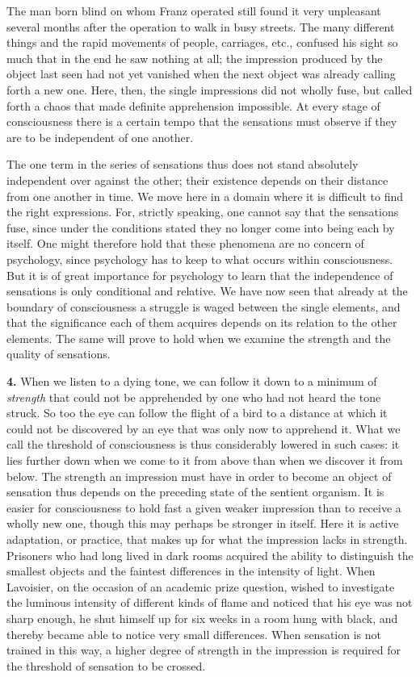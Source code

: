 \documentclass[12pt,a4paper]{book}
\newcommand{\opage}[1]{\marginnote{\footnotesize\textit{[#1]}}}
\begin{document}
The man born blind on whom Franz operated still found it very unpleasant
several months after the operation to walk in busy streets. The many
different things and the rapid movements of people, carriages, etc.,
confused his sight so much that in the end he saw nothing at all; the
impression produced by the object last seen had not yet vanished when
the next object was already calling forth a new one. Here, then, the
single impressions did not wholly fuse, but called forth a chaos that
made definite apprehension impossible. At every stage of consciousness
there is a certain tempo that the sensations must observe if they are to
be independent of one another.

The one term in the series of sensations thus does not stand absolutely
independent over against the other; their existence depends on their
distance from one another in time. We move here in a domain where it is
difficult to find the right expressions. For, strictly speaking, one
cannot say that the sensations fuse, since under the conditions stated
they no longer come into being each by itself. One might therefore hold
that these
\opage{130}phenomena are no concern of psychology, since psychology has
to keep to what occurs within consciousness. But it is of great
importance for psychology to learn that the independence of sensations
is only conditional and relative. We have now seen that already at the
boundary of consciousness a struggle is waged between the single
elements, and that the significance each of them acquires depends on its
relation to the other elements. The same will prove to hold when we
examine the strength and the quality of sensations.

\textbf{4.} When we listen to a dying tone, we can follow it down to a
minimum of \emph{strength} that could not be apprehended by one who had
not heard the tone struck. So too the eye can follow the flight of a
bird to a distance at which it could not be discovered by an eye that
was only now to apprehend it. What we call the threshold of
consciousness is thus considerably lowered in such cases: it lies
further down when we come to it from above than when we discover it from
below. The strength an impression must have in order to become an object
of sensation thus depends on the preceding state of the sentient
organism. It is easier for consciousness to hold fast a given weaker
impression than to receive a wholly new one, though this may perhaps be
stronger in itself. Here it is active adaptation, or practice, that
makes up for what the impression lacks in strength. Prisoners who had
long lived in dark rooms acquired the ability to distinguish the
smallest objects and the faintest differences in the intensity of light.
When Lavoisier, on the occasion of an academic prize question, wished to
investigate the luminous intensity of different kinds of flame and
noticed that his eye was not sharp enough, he shut himself up for six
weeks in a room hung with black, and thereby became able to notice very
small differences. When sensation is not trained in this way, a higher
degree of strength in the impression is required for the threshold of
sensation to be crossed.
\end{document}
